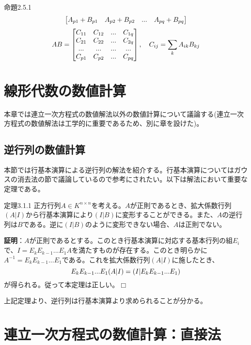 \documentclass[dvipdfmx, 9pt, a4paper]{jsarticle}
\numberwithin{equation}{subsection}
\def\qed{\hfill $\Box$}
\begin{document}
\begin{itembox}[l]{命題2.5.1}
\begin{equation}
\begin{bmatrix}
A_{p1}+B_{p1} & A_{p2}+B_{p2} & ... & A_{pq}+B_{pq} \\
\end{bmatrix}\notag
\end{equation}
\begin{equation}
AB = 
\begin{bmatrix}
C_{11} & C_{12} & ... & C_{1q} \\
C_{21} & C_{22} & ... & C_{2q} \\
... & ... & ... & ... \\
C_{p1} & C_{p2} & ... & C_{pq} \\
\end{bmatrix},~~~C_{ij}=\sum_k A_{ik}B_{kj} \notag
\end{equation}
\end{itembox}


\section{線形代数の数値計算}
本章では連立一次方程式の数値解法以外の数値計算について議論する(連立一次方程式の数値解法は工学的に重要であるため、別に章を設けた)。
\subsection{逆行列の数値計算}
本節では行基本演算による逆行列の解法を紹介する。行基本演算についてはガウスの消去法の節で議論しているので参考にされたい。以下は解法において重要な定理である。
\begin{itembox}[l]{定理3.1.1}
正方行列$A \in K^{n \times n}$を考える。$A$が正則であるとき、拡大係数行列$(A|I)$から行基本演算により$(I|B)$に変形することができる。また、$A$の逆行列は$B$である。逆に$(I|B)$のように変形できない場合、$A$は正則でない。
\end{itembox}
{\bf 証明}：$A$が正則であるとする。このとき行基本演算に対応する基本行列の組$E_i$で、$I=E_kE_{k-1}...E_1A$を満たすものが存在する。このとき明らかに$A^{-1}=E_kE_{k-1}...E_1$である。これを拡大係数行列$(A|I)$に施したとき、
\begin{equation}
E_kE_{k-1}...E_1(A|I)=(I|E_kE_{k-1}...E_1) \notag
\end{equation}
が得られる。従って本定理は正しい。\qed \par
上記定理より、逆行列は行基本演算より求められることが分かる。

\section{連立一次方程式の数値計算：直接法}
\end{document}
